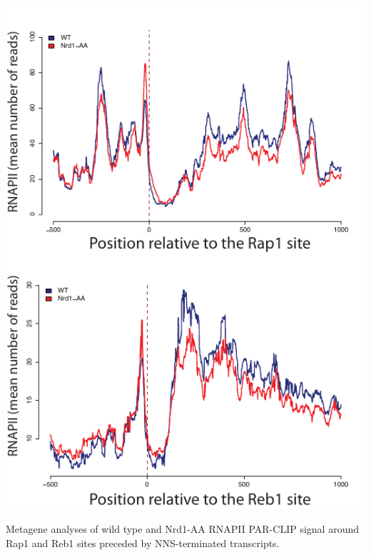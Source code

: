 \begin{suppfigure}[h!]

\centering
\includegraphics[width=\textwidth]{figures/results/rap/S9.pdf}
\caption[dfgdf]{Metagene analyses of wild type and Nrd1-AA RNAPII PAR-CLIP signal around Rap1 and Reb1 sites preceded by NNS-terminated transcripts.}
\label{fig:S9}

\end{suppfigure}



